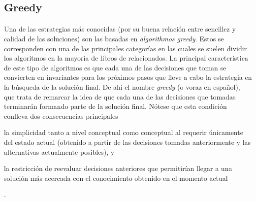 \documentclass{subfiles}
\begin{document}
      \subsection{Greedy}
      \label{sec:solving_greedy}

        \paragraph{}
        Una de las estrategias más conocidas (por su buena relación entre sencillez y calidad de las soluciones) son las basadas en \emph{algorithmos greedy}. Estos se corresponden con una de las principales categorías en las cuales se suelen dividir los algoritmos en la mayoría de libros de relacionados. La principal característica de este tipo de algoritmos es que cada una de las decisiones que toman se convierten en invariantes para los próximos pasos que lleve a cabo la estrategia en la búsqueda de la solución final. De ahí el nombre \emph{greedy} (o voraz en español), que trata de remarcar la idea de que cada una de las decisiones que tomadas terminarán formando parte de la solución final. Nótese que esta condición conlleva dos consecuencias principales \begin{enumerate*}[label=(\arabic*)] \item la simplicidad tanto a nivel conceptual como conceptual al requerir únicamente del estado actual (obtenido a partir de las decisiones tomadas anteriormente y las alternativas actualmente posibles), y \item la restricción de reevaluar decisiones anteriores que permitirían llegar a una solución más acercada con el conocimiento obtenido en el momento actual \end{enumerate*}.
\end{document}
